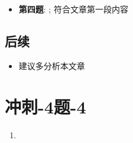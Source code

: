     \begin{itemize}
      \item \textbf{第四题}: ; 符合文章第一段内容
    \end{itemize}

  \subsection{后续}

    \begin{itemize}
      \item 建议多分析本文章
    \end{itemize}

\section{冲刺-4题-4}

  \begin{enumerate}
    \item
  \end{enumerate}
